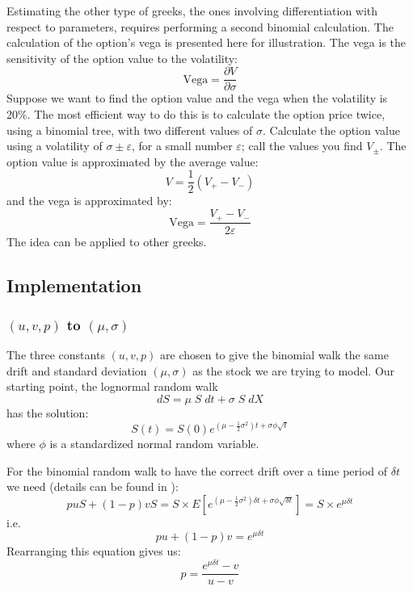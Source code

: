 Estimating the other type of greeks, the ones involving differentiation with respect to parameters, requires performing a second binomial calculation. The calculation of the option's vega is presented here for illustration. The vega is the sensitivity of the option value to the volatility:
\begin{equation}
    \text{Vega} = \frac{\partial V}{\partial \sigma}
\end{equation}
Suppose we want to find the option value and the vega when the volatility is 20\%. The most efficient way to do this is to calculate the option price twice, using a binomial tree, with two different values of $\sigma$. Calculate the option value using a volatility of $\sigma \pm \varepsilon$, for a small number $\varepsilon$; call the values you find $V_\pm$. The option value is approximated by the average value:
\begin{equation}
    V = \frac{1}{2} \left( V_{+} - V_{-} \right)
\end{equation}
and the vega is approximated by:
\begin{equation}
    \text{Vega} = \frac{V_{+} - V_{-}}{2 \varepsilon}
\end{equation}
The idea can be applied to other greeks.



\subsection{Implementation}
\subsubsection{$(u,v,p)$ to $(\mu,\sigma)$}
The three constants $(u,v,p)$ are chosen to give the binomial walk the same drift and standard deviation $(\mu,\sigma)$ as the stock we are trying to model. Our starting point, the lognormal random walk
\begin{equation}
    dS = \mu \; S \; dt + \sigma \; S \; dX
\end{equation}
has the solution:
\begin{equation}
    S(t) = S(0) e^{\left( \mu - \frac{1}{2} \sigma^2 \right) t + \sigma \phi \sqrt{t}}
\end{equation}
where $\phi$ is a standardized normal random variable. 

For the binomial random walk to have the correct drift over a time period of $\delta t$ we need (details can be found in \cite{pw_mathfinderiv_1995}):
\begin{equation}
    puS + (1-p)vS = S \times E \left[ e^{\left( \mu - \frac{1}{2} \sigma^2 \right) \delta t + \sigma \phi \sqrt{\delta t}} \right] = S \times e^{\mu \delta t}
\end{equation}
i.e.
\begin{equation}
    pu + (1-p)v = e^{\mu \delta t}
\end{equation}
Rearranging this equation gives us:
\begin{equation}
    p = \frac{e^{\mu \delta t} - v}{u - v}
    \label{equ:binomial_cond_1}
\end{equation}


